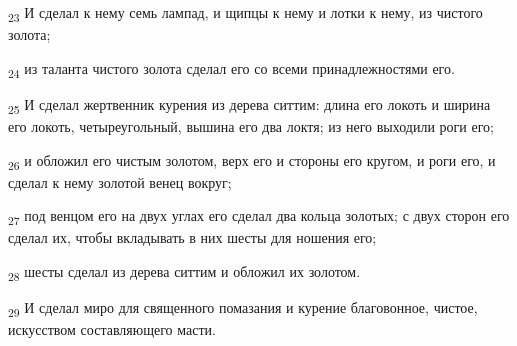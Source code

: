 \begin{tcolorbox}
\textsubscript{23} И сделал к нему семь лампад, и щипцы к нему и лотки к нему, из чистого золота;
\end{tcolorbox}
\begin{tcolorbox}
\textsubscript{24} из таланта чистого золота сделал его со всеми принадлежностями его.
\end{tcolorbox}
\begin{tcolorbox}
\textsubscript{25} И сделал жертвенник курения из дерева ситтим: длина его локоть и ширина его локоть, четыреугольный, вышина его два локтя; из него выходили роги его;
\end{tcolorbox}
\begin{tcolorbox}
\textsubscript{26} и обложил его чистым золотом, верх его и стороны его кругом, и роги его, и сделал к нему золотой венец вокруг;
\end{tcolorbox}
\begin{tcolorbox}
\textsubscript{27} под венцом его на двух углах его сделал два кольца золотых; с двух сторон его сделал их, чтобы вкладывать в них шесты для ношения его;
\end{tcolorbox}
\begin{tcolorbox}
\textsubscript{28} шесты сделал из дерева ситтим и обложил их золотом.
\end{tcolorbox}
\begin{tcolorbox}
\textsubscript{29} И сделал миро для священного помазания и курение благовонное, чистое, искусством составляющего масти.
\end{tcolorbox}
